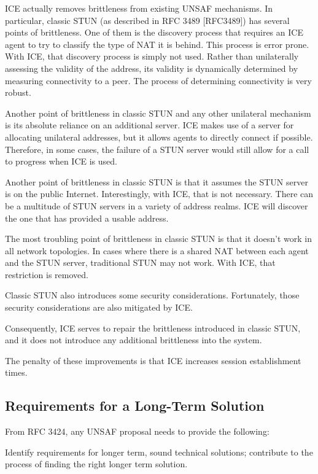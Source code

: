 \documentclass{article}
\begin{document}
ICE actually removes brittleness from existing UNSAF mechanisms.  In particular, classic STUN (as described in RFC 3489 [RFC3489]) has several points of brittleness.  One of them is the discovery process that requires an ICE agent to try to classify the type of NAT it is behind.  This process is error prone.  With ICE, that discovery process is simply not used.  Rather than unilaterally assessing the validity of the address, its validity is dynamically determined by measuring connectivity to a peer.  The process of determining connectivity is very robust.

Another point of brittleness in classic STUN and any other unilateral mechanism is its absolute reliance on an additional server.  ICE makes use of a server for allocating unilateral addresses, but it allows agents to directly connect if possible.  Therefore, in some cases, the failure of a STUN server would still allow for a call to progress when ICE is used.

Another point of brittleness in classic STUN is that it assumes the STUN server is on the public Internet.  Interestingly, with ICE, that is not necessary.  There can be a multitude of STUN servers in a variety of address realms.  ICE will discover the one that has provided a usable address.

The most troubling point of brittleness in classic STUN is that it doesn't work in all network topologies.  In cases where there is a shared NAT between each agent and the STUN server, traditional STUN may not work.  With ICE, that restriction is removed.

Classic STUN also introduces some security considerations. Fortunately, those security considerations are also mitigated by ICE.

Consequently, ICE serves to repair the brittleness introduced in classic STUN, and it does not introduce any additional brittleness into the system.

The penalty of these improvements is that ICE increases session establishment times.

\subsection{Requirements for a Long-Term Solution}

From RFC 3424, any UNSAF proposal needs to provide the following:

Identify requirements for longer term, sound technical solutions; contribute to the process of finding the right longer term solution.
\end{document}
